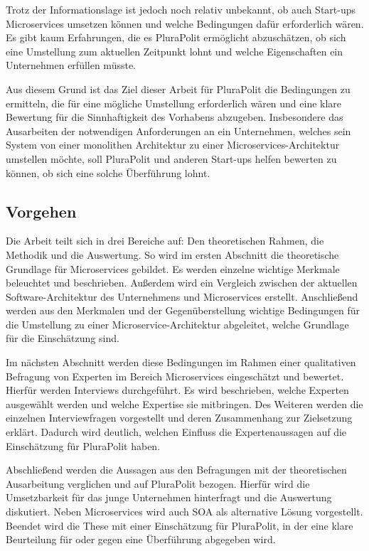 Trotz der Informationslage ist jedoch noch relativ unbekannt, ob auch Start-ups Microservices umsetzen können und welche Bedingungen dafür erforderlich wären. Es gibt kaum Erfahrungen, die es PluraPolit ermöglicht abzuschätzen, ob sich eine Umstellung zum aktuellen Zeitpunkt lohnt und welche Eigenschaften ein Unternehmen erfüllen müsste.

Aus diesem Grund ist das Ziel dieser Arbeit für PluraPolit die Bedingungen zu ermitteln, die für eine mögliche Umstellung erforderlich wären und eine klare Bewertung für die Sinnhaftigkeit des Vorhabens abzugeben. Insbesondere das Ausarbeiten der notwendigen Anforderungen an ein Unternehmen, welches sein System von einer monolithen Architektur zu einer Microservices-Architektur umstellen möchte, soll PluraPolit und anderen Start-ups helfen bewerten zu können, ob sich eine solche Überführung lohnt.

\subsection{Vorgehen}

Die Arbeit teilt sich in drei Bereiche auf: Den theoretischen Rahmen, die Methodik und die Auswertung.  So wird im ersten Abschnitt die theoretische Grundlage für Microservices gebildet. Es werden einzelne wichtige Merkmale beleuchtet und beschrieben. Außerdem wird ein Vergleich zwischen der aktuellen Software-Architektur des Unternehmens und Microservices erstellt. Anschließend werden aus den Merkmalen und der Gegenüberstellung wichtige Bedingungen für die Umstellung zu einer Microservice-Architektur abgeleitet, welche Grundlage für die Einschätzung sind.

Im nächsten Abschnitt werden diese Bedingungen im Rahmen einer qualitativen Befragung von Experten im Bereich Microservices eingeschätzt und bewertet. Hierfür werden Interviews durchgeführt. Es wird beschrieben, welche Experten ausgewählt werden und welche Expertise sie mitbringen. Des Weiteren werden die einzelnen Interviewfragen vorgestellt und deren Zusammenhang zur Zielsetzung erklärt. Dadurch wird deutlich, welchen Einfluss die Expertenaussagen auf die Einschätzung für PluraPolit haben.

Abschließend werden die Aussagen aus den Befragungen mit der theoretischen Ausarbeitung verglichen und auf PluraPolit bezogen. Hierfür wird die Umsetzbarkeit für das junge Unternehmen hinterfragt und die Auswertung diskutiert. Neben Microservices wird auch SOA als alternative Lösung vorgestellt. Beendet wird die These mit einer Einschätzung für PluraPolit, in der eine klare Beurteilung für oder gegen eine Überführung abgegeben wird.